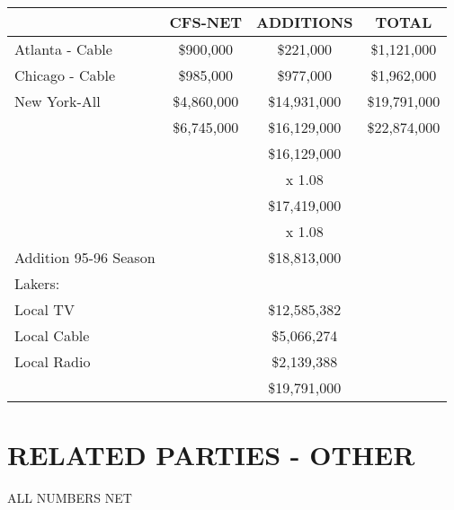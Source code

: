 \documentclass[
]{book}
\begin{document}
\begin{longtable}[]{@{}lccc@{}}
\toprule()
& CFS-NET & ADDITIONS & TOTAL \\
\midrule()
\endhead
Atlanta - Cable & \$900,000 & \$221,000 & \$1,121,000 \\
Chicago - Cable & \$985,000 & \$977,000 & \$1,962,000 \\
New York-All & \$4,860,000 & \$14,931,000 & \$19,791,000 \\
& \$6,745,000 & \$16,129,000 & \$22,874,000 \\
& & \$16,129,000 & \\
& & x 1.08 & \\
& & \$17,419,000 & \\
& & x 1.08 & \\
Addition 95-96 Season & & \$18,813,000 & \\
Lakers: & & & \\
Local TV & & \$12,585,382 & \\
Local Cable & & \$5,066,274 & \\
Local Radio & & \$2,139,388 & \\
& & \$19,791,000 & \\
\bottomrule()
\end{longtable}

\hypertarget{related-parties---other}{%
\section{RELATED PARTIES - OTHER}\label{related-parties---other}}

ALL NUMBERS NET
\end{document}
